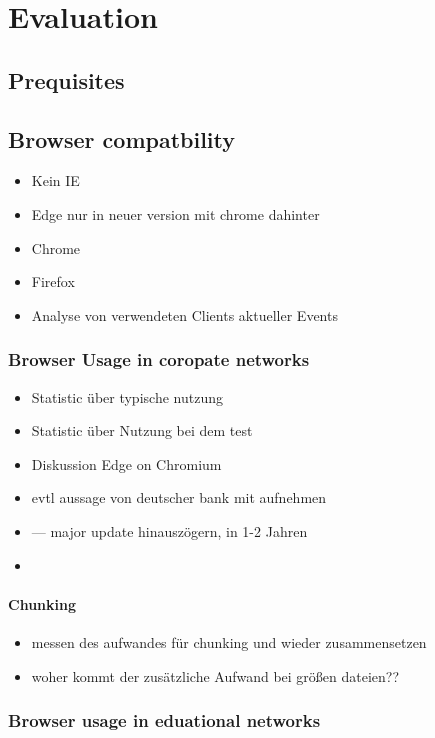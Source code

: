 \chapter{Evaluation}\label{ch:evaluation}

\section{Prequisites}

\section{Browser compatbility}

\begin{itemize}
	\item Kein IE
	\item Edge nur in neuer version mit chrome dahinter
	\item Chrome
	\item Firefox
	\item Analyse von verwendeten Clients aktueller Events
\end{itemize}
\subsection{Browser Usage in coropate networks}

\begin{itemize}
	\item Statistic über typische nutzung
	\item Statistic über Nutzung bei dem test
	\item Diskussion Edge on Chromium
	\item evtl aussage von deutscher bank mit aufnehmen
	\item  --- major update hinauszögern, in 1-2 Jahren
	\item 
\end{itemize}

\subsubsection{Chunking}
\begin{itemize}
	\item messen des aufwandes für chunking und wieder zusammensetzen
	\item woher kommt der zusätzliche Aufwand bei größen dateien??
\end{itemize}

\subsection{Browser usage in eduational networks}

